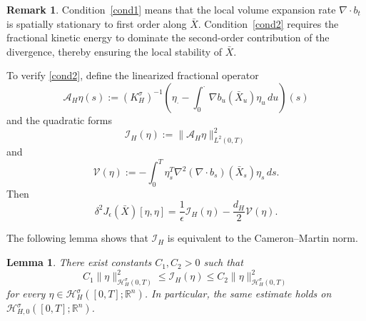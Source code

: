 \documentclass[preprint,12pt]{elsarticle}
\newtheorem{lemma}[theorem]{Lemma}
\theoremstyle{definition}
\newtheorem{remark}{Remark}[section]
\theoremstyle{plain}
\begin{document}
\begin{remark}
Condition~\eqref{cond1} means that the local volume expansion rate
$\nabla\!\cdot b_t$ is spatially stationary to first order along
$\bar X$. Condition~\eqref{cond2} requires the fractional kinetic
energy to dominate the second-order contribution of the divergence,
thereby ensuring the local stability of $\bar X$.
\end{remark}

To verify \eqref{cond2}, define the linearized fractional operator
\begin{equation}
\label{eq:AH-definition}
    \mathcal A_H\eta(s)
    :=
    (K_H^\sigma)^{-1}
    \left(
        \eta_\cdot
        -
        \int_0^\cdot
        \nabla b_u(\bar X_u)\eta_u\,du
    \right)(s)
\end{equation}
and the quadratic forms
\begin{equation}
\label{eq:kinetic-part}
    \mathcal I_H(\eta)
    :=
    \|\mathcal A_H\eta\|_{L^2(0,T)}^2
\end{equation}
and
\begin{equation}
\label{eq:potential-part}
    \mathcal V(\eta)
    :=
    -
    \int_0^T
    \eta_s^T
    \nabla^2(\nabla\!\cdot b_s)(\bar X_s)
    \eta_s\,ds.
\end{equation}
Then
\begin{equation}
\label{eq:second-variation-decomposition}
    \delta^2J_\epsilon(\bar X)[\eta,\eta]
    =
    \frac{1}{\epsilon}\mathcal I_H(\eta)
    -
    \frac{d_H}{2}\mathcal V(\eta).
\end{equation}

The following lemma shows that $\mathcal I_H$ is equivalent to the
Cameron--Martin norm.

\begin{lemma}
\label{lem:IH-HH-equivalence}
There exist constants $C_1,C_2>0$ such that
\begin{equation}
\label{eq:IH-HH-equivalence}
    C_1
    \|\eta\|_{\mathcal H_H^\sigma(0,T)}^2
    \leq
    \mathcal I_H(\eta)
    \leq
    C_2
    \|\eta\|_{\mathcal H_H^\sigma(0,T)}^2
\end{equation}
for every
$\eta\in\mathcal H_H^\sigma([0,T];\mathbb R^n)$. In particular, the
same estimate holds on
$\mathcal H_{H,0}^\sigma([0,T];\mathbb R^n)$.
\end{lemma}
\end{document}
